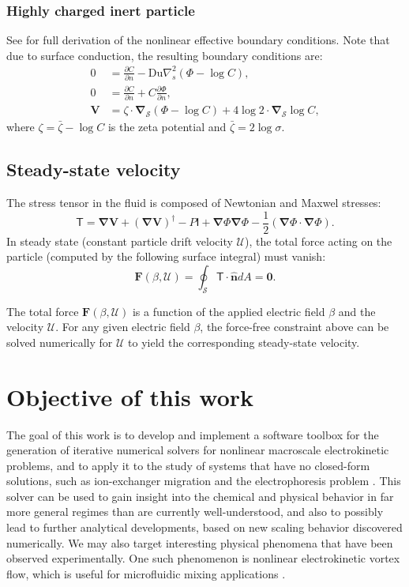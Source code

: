 \documentclass[MSc,beforeExam]{iitcsthesis}
\newcommand{\deriv}[2]{\frac{\partial #1}{\partial #2}}
\newcommand{\pars}[1]{\left(#1\right)}
\newcommand\bnabla{\boldsymbol{\nabla}}
\newcommand\bV{\boldsymbol{V}}
\newcommand\bF{\boldsymbol{F}}
\newcommand\bnhat{\hat{\boldsymbol{n}}}
\newcommand\bzero{\boldsymbol{0}}
\newcommand\Du{\text{Du}}
\newcommand\cU{\mathscr{U}}
\newcommand\tI{\mathsf{I}}
\newcommand\tT{\mathsf{T}}
\begin{document}
\subsubsection{Highly charged inert particle}
See \cite{schnitzer2012surface} for full derivation
of the nonlinear effective boundary conditions. 
Note that due to surface conduction, the resulting boundary conditions are:
\begin{align} \label{eq:ephor_bnd}
\nonumber
0 &= {\deriv{C}{n} - \Du \nabla^2_s \pars{\varPhi - \log C}}, \\
0 &= {\deriv{C}{n} + C \deriv{\varPhi}{n}}, \\
\nonumber
\bV &= \zeta \cdot \bnabla_\mathcal{S} \pars{\varPhi - \log C} +
4 \log 2 \cdot \bnabla_\mathcal{S} \log C,
\end{align}
where $\zeta = \bar{\zeta} - \log C$ 
is the zeta potential and $\bar{\zeta} = 2 \log \sigma$.

\subsection{Steady-state velocity}
The stress tensor in the fluid is composed of Newtonian and Maxwel stresses:
\begin{equation}
\label{eq:tensor}
\tT = \bnabla \bV + (\bnabla \bV)^\dagger - P \tI
+ \bnabla \varPhi \bnabla \varPhi - \frac{1}{2} (\bnabla \varPhi \cdot \bnabla \varPhi). 
\end{equation} 
In steady state (constant particle drift velocity $\cU$), the total force acting on the particle 
(computed by the following surface integral) must vanish:
\begin{equation} \label{eq:zero_force}
 \bF(\beta, \cU) = \oint_\mathcal{S} \tT \cdot \bnhat dA = \bzero.
\end{equation}

The total force $\bF(\beta, \cU)$ is a function of the applied electric field $\beta$ and
the velocity $\cU$.
For any given electric field $\beta$, the force-free constraint above 
can be solved numerically for $\cU$ to yield the corresponding steady-state velocity.

\section{Objective of this work}

The goal of this work is to develop and implement a software toolbox 
for the generation of iterative numerical solvers for nonlinear macroscale 
electrokinetic problems, and to apply it to the study
of systems that have no closed-form solutions, 
such as ion-exchanger migration \cite{yariv2010migration} 
and the electrophoresis problem \cite{schnitzer2012surface}.
This solver can be used to gain insight into the chemical 
and physical behavior in far more general regimes than 
are currently well-understood, 
and also to possibly lead to further analytical developments, 
based on new scaling behavior
discovered numerically. 
We may also target interesting physical
phenomena that have been observed experimentally.
One such phenomenon is nonlinear electrokinetic vortex flow, 
which is useful for microfluidic mixing applications 
\cite{wang2004mix, ben2002vortex}.
\end{document}
